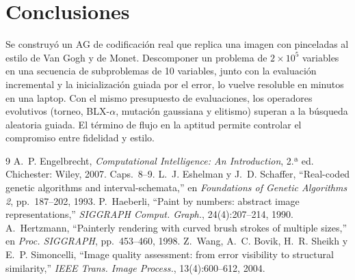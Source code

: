 \documentclass[10pt,letterpaper]{article}
\begin{document}
\section{Conclusiones}
Se construyó un AG de codificación real que replica una imagen con pinceladas al estilo de Van Gogh y de Monet. Descomponer un problema de $2\times10^5$ variables en una secuencia de subproblemas de 10 variables, junto con la evaluación incremental y la inicialización guiada por el error, lo vuelve resoluble en minutos en una laptop. Con el mismo presupuesto de evaluaciones, los operadores evolutivos (torneo, BLX-$\alpha$, mutación gaussiana y elitismo) superan a la búsqueda aleatoria guiada. El término de flujo en la aptitud permite controlar el compromiso entre fidelidad y estilo.

\begin{thebibliography}{9}\small
\setlength\itemsep{0em}
 A.~P. Engelbrecht, \emph{Computational Intelligence: An Introduction}, 2.ª ed. Chichester: Wiley, 2007. Caps.~8--9.
 L.~J. Eshelman y J.~D. Schaffer, ``Real-coded genetic algorithms and interval-schemata,'' en \emph{Foundations of Genetic Algorithms 2}, pp.~187--202, 1993.
 P.~Haeberli, ``Paint by numbers: abstract image representations,'' \emph{SIGGRAPH Comput. Graph.}, 24(4):207--214, 1990.
 A.~Hertzmann, ``Painterly rendering with curved brush strokes of multiple sizes,'' en \emph{Proc. SIGGRAPH}, pp.~453--460, 1998.
 Z.~Wang, A.~C. Bovik, H.~R. Sheikh y E.~P. Simoncelli, ``Image quality assessment: from error visibility to structural similarity,'' \emph{IEEE Trans. Image Process.}, 13(4):600--612, 2004.
\end{thebibliography}
\end{document}
